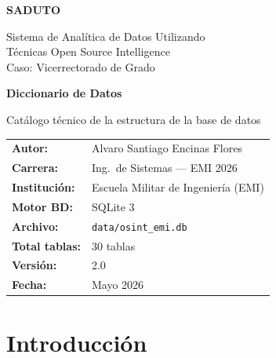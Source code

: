 \documentclass[11pt,a4paper]{article}
\begin{document}
\begin{titlepage}
\centering
\vspace*{2cm}

{\Huge\bfseries\color{emiblue}SADUTO\par}
\vspace{0.3cm}
{\large\color{emidark}Sistema de Analítica de Datos Utilizando\\Técnicas Open Source Intelligence\\Caso: Vicerrectorado de Grado\par}

\vspace{1cm}
\noindent\makebox[\textwidth]{\color{emiblue}\rule{0.6\textwidth}{2pt}}
\vspace{1cm}

{\LARGE\bfseries Diccionario de Datos\par}
\vspace{0.3cm}
{\large Catálogo técnico de la estructura de la base de datos\par}

\vfill

\begin{tabular}{ll}
\textbf{Autor:}         & Alvaro Santiago Encinas Flores \\
\textbf{Carrera:}       & Ing.\ de Sistemas — EMI 2026 \\
\textbf{Institución:}   & Escuela Militar de Ingeniería (EMI) \\
\textbf{Motor BD:}      & SQLite 3 \\
\textbf{Archivo:}       & \texttt{data/osint\_emi.db} \\
\textbf{Total tablas:}  & 30 tablas \\
\textbf{Versión:}       & 2.0 \\
\textbf{Fecha:}         & Mayo 2026 \\
\end{tabular}

\vspace{1cm}
\noindent\makebox[\textwidth]{\color{emiyellow}\rule{0.4\textwidth}{3pt}}
\end{titlepage}

\tableofcontents
\newpage

\section{Introducción}
\end{document}

